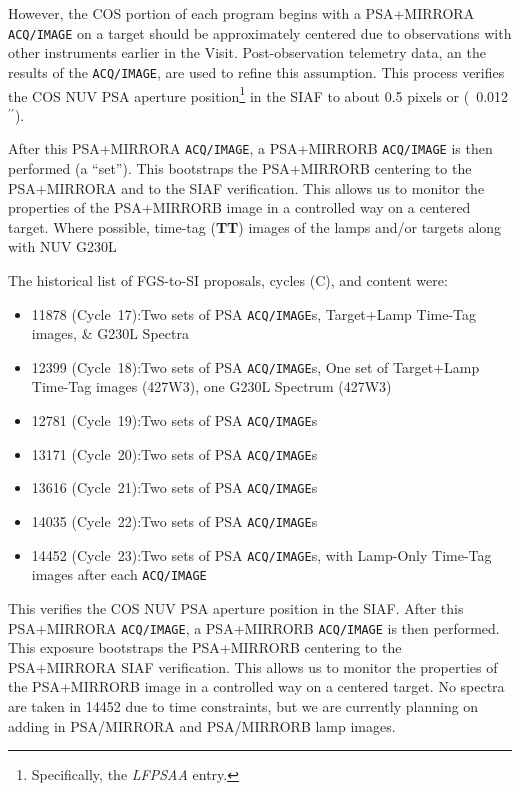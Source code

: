 \documentclass[12pt]{reportj}
\def\arcsec{\hbox{$^{\prime\prime}$}}
\begin{document}
However, the COS portion of each program begins with a PSA+MIRRORA \texttt{ACQ/IMAGE} on a target should be approximately centered due to observations with other instruments earlier in the Visit.
Post-observation telemetry data, an the results of the \texttt{ACQ/IMAGE}, are used to refine this assumption.
This process verifies the COS NUV PSA aperture position\footnote{Specifically, the \textit{LFPSAA} entry.} in the SIAF to about 0.5 pixels or (~0.012\arcsec).

After this PSA+MIRRORA \texttt{ACQ/IMAGE}, a PSA+MIRRORB \texttt{ACQ/IMAGE} is then performed (a ``set'').
This bootstraps the PSA+MIRRORB centering to the PSA+MIRRORA and to the SIAF verification.
This allows us to monitor the properties of the PSA+MIRRORB image in a controlled way on a centered target.
Where possible, time-tag (\textbf{TT}) images of the lamps and/or targets along with NUV G230L

The historical list of FGS-to-SI proposals, cycles (C), and content were:
\begin{itemize}
	\item{11878 (Cycle~17):}{Two sets of PSA \texttt{ACQ/IMAGE}s, Target+Lamp Time-Tag images, \& G230L Spectra}
	\item{12399 (Cycle~18):}{Two sets of PSA \texttt{ACQ/IMAGE}s, One set of Target+Lamp Time-Tag images (427W3), one G230L Spectrum (427W3)}
	\item{12781 (Cycle~19):}{Two sets of PSA \texttt{ACQ/IMAGE}s}
	\item{13171 (Cycle~20):}{Two sets of PSA \texttt{ACQ/IMAGE}s}
	\item{13616 (Cycle~21):}{Two sets of PSA \texttt{ACQ/IMAGE}s}
	\item{14035 (Cycle~22):}{Two sets of PSA \texttt{ACQ/IMAGE}s}
	\item{14452 (Cycle~23):}{Two sets of PSA \texttt{ACQ/IMAGE}s,  with Lamp-Only Time-Tag images after each \texttt{ACQ/IMAGE}}
\end{itemize}

This verifies the COS NUV PSA aperture position in the SIAF. After this PSA+MIRRORA \texttt{ACQ/IMAGE}, a PSA+MIRRORB \texttt{ACQ/IMAGE} is then performed.
This exposure bootstraps the PSA+MIRRORB centering to the PSA+MIRRORA SIAF verification.
This allows us to monitor the properties of the PSA+MIRRORB image in a controlled way on a centered target.
No spectra are taken in 14452 due to time constraints, but we are currently planning on adding in PSA/MIRRORA and PSA/MIRRORB lamp images.
\end{document}
